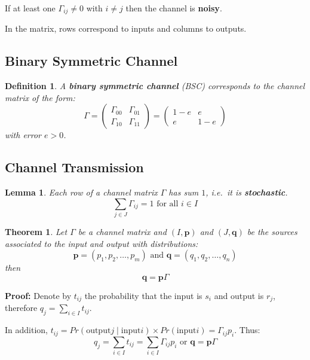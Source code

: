\documentclass[11pt]{article}
\newtheorem{defn}{Definition}
\newtheorem{theo}{Theorem}
\newtheorem{lem}{Lemma}
\begin{document}
If at least one $\Gamma_{ij} \neq 0$ with $i \neq j$ then the channel is \textbf{noisy}.

In the matrix, rows correspond to inputs and columns to outputs.

\subsection{Binary Symmetric Channel}
\begin{defn}
  A \textbf{binary symmetric channel} (BSC) corresponds to the channel matrix of the form:
  \[
    \Gamma =
    \begin{pmatrix}
      \Gamma_{00} & \Gamma_{01} \\
      \Gamma_{10} & \Gamma_{11}
    \end{pmatrix}
    =
    \begin{pmatrix}
      1 - e & e \\
      e & 1- e
    \end{pmatrix}
  \]
  with error $e > 0$.
\end{defn}

\subsection{Channel Transmission}
\begin{lem}
  Each row of a channel matrix $\Gamma$ has sum $1$, i.e.\ it is \textbf{stochastic}.
  \[
    \sum_{j \in J} \Gamma_{ij} = 1 \text{ for all } i \in I
  \]
\end{lem}

\begin{theo}
  Let $\Gamma$ be a channel matrix and $(I, \textbf{p})$ and $(J, \textbf{q})$ be the sources associated to the input and output with distributions:
  \[
    \textbf{p} = (p_1, p_2, \ldots, p_m) \text{ and } \textbf{q} = (q_1, q_2, \ldots, q_n)
  \]
  then
  \[
    \textbf{q} = \textbf{p} \Gamma
  \]
\end{theo}

\textbf{Proof:}
Denote by $t_{ij}$ the probability that the input is $s_i$ and output is $r_j$, therefore $q_j = \sum_{i \in I} t_{ij}$.

In addition, $t_{ij} = Pr(\text{output} j \mid \text{input} i) \times Pr(\text{input} i) = \Gamma_{ij}p_i$.
Thus:
\[
  q_j = \sum_{i \in I} t_{ij} = \sum_{i \in I} \Gamma_{ij} p_i \text{ or } \textbf{q} = \textbf{p}\Gamma
\]
\end{document}

